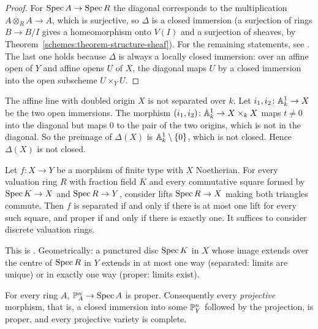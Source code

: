 \begin{proof}
For $\operatorname{Spec} A \to \operatorname{Spec} R$ the diagonal corresponds to the multiplication $A \otimes_RA \to A$, which is surjective, so $\Delta$ is a closed immersion (a
surjection of rings $B \to B/I$ gives a homeomorphism onto $V(I)$ and a surjection of sheaves, by Theorem~\ref{schemes:theorem-structure-sheaf}).
For the remaining statements, see \cite[Corollary II.4.2 and Corollary II.4.6]{hartshorne-ag}. The last one holds because $\Delta$ is always a
locally closed immersion: over an affine open of $Y$ and affine opens $U$ of $X$, the diagonal maps $U$ by a closed immersion into the open
subscheme $U \times_YU$.
\end{proof}

\begin{example}\label{schemes:example-not-separated}
The affine line with doubled origin $X$ is not separated over $k$. Let $i_1, i_2 \colon \mathbb{A}^1_k \to X$ be the two open immersions. The morphism
$(i_1, i_2) \colon \mathbb{A}^1_k \to X \times_kX$ maps $t \neq 0$ into the diagonal but maps $0$ to the pair of the two origins, which is not in the diagonal. So
the preimage of $\Delta(X)$ is $\mathbb{A}^1_k \setminus \{0\}$, which is not closed. Hence $\Delta(X)$ is not closed.
\end{example}

\begin{theorem}\label{schemes:theorem-valuative}
Let $f \colon X \to Y$ be a morphism of finite type with $X$ Noetherian. For every valuation ring $R$ with fraction field $K$ and every
commutative square formed by $\operatorname{Spec} K \to X$ and $\operatorname{Spec} R \to Y$, consider lifts $\operatorname{Spec} R \to X$ making both triangles commute. Then $f$ is separated
if and only if there is at most one lift for every such square, and proper if and only if there is exactly one. It suffices to consider discrete
valuation rings.
\end{theorem}

This is \cite[Theorems II.4.3 and II.4.7 and Exercise II.4.11]{hartshorne-ag}. Geometrically: a punctured disc $\operatorname{Spec} K$ in $X$ whose image extends
over the centre of $\operatorname{Spec} R$ in $Y$ extends in at most one way (separated: limits are unique) or in exactly one way (proper: limits exist).

\begin{theorem}\label{schemes:theorem-projective-proper}
For every ring $A$, $\mathbb{P}^n_A \to \operatorname{Spec} A$ is proper. Consequently every \emph{projective} morphism, that is, a closed immersion into some $\mathbb{P}^n_Y$
followed by the projection, is proper, and every projective variety is complete.
\end{theorem}

